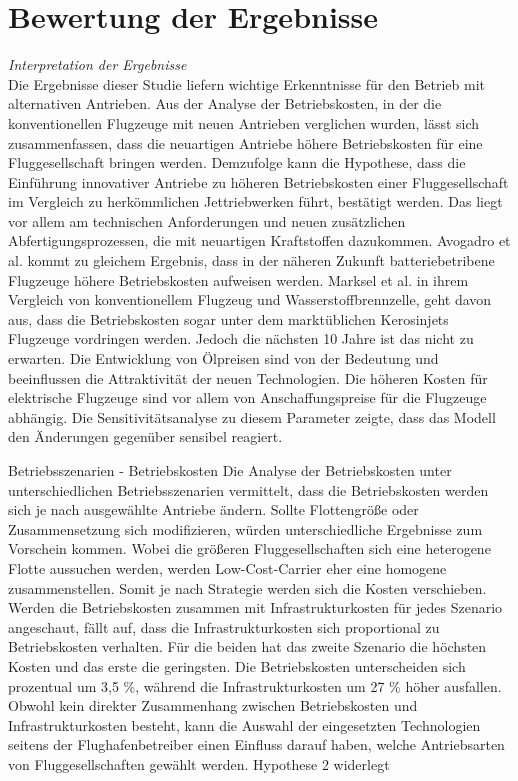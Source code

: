 
\section{Bewertung der Ergebnisse}
\label{s:Bewertung der Ergebnisse}

\textit{Interpretation der Ergebnisse}\\
Die Ergebnisse dieser Studie liefern wichtige Erkenntnisse für den Betrieb mit alternativen Antrieben.
Aus der Analyse der Betriebskosten, in der die konventionellen Flugzeuge mit neuen Antrieben verglichen wurden, 
lässt sich zusammenfassen, dass die neuartigen Antriebe höhere Betriebskosten für eine Fluggesellschaft bringen werden.
Demzufolge kann die Hypothese, dass die Einführung innovativer Antriebe zu höheren Betriebskosten einer Fluggesellschaft im Vergleich zu herkömmlichen
Jettriebwerken führt, bestätigt werden. Das liegt vor allem am technischen Anforderungen und neuen zusätzlichen Abfertigungsprozessen, die mit neuartigen
Kraftstoffen dazukommen. Avogadro et al.\cite{avogadro2024demystifying} kommt zu gleichem Ergebnis, 
dass in der näheren Zukunft batteriebetribene Flugzeuge höhere Betriebskosten aufweisen werden. Marksel et al. \cite{marksel2023comparative} in ihrem
Vergleich von konventionellem Flugzeug und Wasserstoffbrennzelle, geht davon aus, dass die Betriebskosten sogar unter dem marktüblichen Kerosinjets
Flugzeuge vordringen werden. Jedoch die nächsten 10 Jahre ist das nicht zu erwarten. Die Entwicklung von Ölpreisen sind von der Bedeutung und beeinflussen
die Attraktivität der neuen Technologien.
%
Die höheren Kosten für elektrische Flugzeuge sind vor allem von Anschaffungspreise für
die Flugzeuge abhängig. Die Sensitivitätsanalyse zu diesem Parameter zeigte, dass das Modell den Änderungen gegenüber sensibel reagiert.



Betriebsszenarien - Betriebskosten
Die Analyse der Betriebskosten unter unterschiedlichen Betriebsszenarien vermittelt, dass die Betriebskosten werden sich je nach
ausgewählte Antriebe ändern. Sollte Flottengröße oder Zusammensetzung sich modifizieren, würden unterschiedliche Ergebnisse zum Vorschein kommen.
Wobei die größeren Fluggesellschaften sich eine heterogene Flotte aussuchen werden, werden Low-Cost-Carrier eher eine homogene zusammenstellen.
Somit je nach Strategie werden sich die Kosten verschieben.
Werden die Betriebskosten zusammen mit Infrastrukturkosten für jedes Szenario angeschaut, fällt auf, dass die Infrastrukturkosten sich proportional 
zu Betriebskosten verhalten. Für die beiden hat das zweite Szenario die höchsten Kosten und das erste die geringsten. 
Die Betriebskosten unterscheiden sich prozentual um 3,5 \%, während die Infrastrukturkosten um 27 \% höher ausfallen.
Obwohl kein direkter Zusammenhang zwischen Betriebskosten und Infrastrukturkosten besteht, 
kann die Auswahl der eingesetzten Technologien seitens der Flughafenbetreiber einen Einfluss darauf haben, 
welche Antriebsarten von Fluggesellschaften gewählt werden.
Hypothese 2 widerlegt

